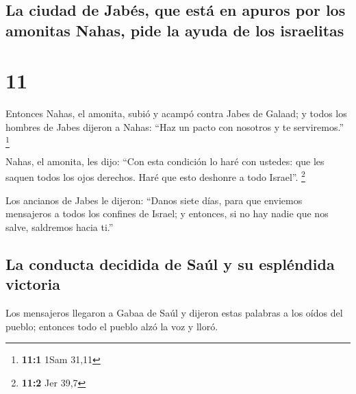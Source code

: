 \hypertarget{la-ciudad-de-jabuxe9s-que-estuxe1-en-apuros-por-los-amonitas-nahas-pide-la-ayuda-de-los-israelitas}{%
\subsection{La ciudad de Jabés, que está en apuros por los amonitas
Nahas, pide la ayuda de los
israelitas}\label{la-ciudad-de-jabuxe9s-que-estuxe1-en-apuros-por-los-amonitas-nahas-pide-la-ayuda-de-los-israelitas}}

\hypertarget{section-10}{%
\section{11}\label{section-10}}

 Entonces Nahas, el amonita, subió y acampó contra Jabes
de Galaad; y todos los hombres de Jabes dijeron a Nahas: ``Haz un pacto
con nosotros y te serviremos.'' \footnote{\textbf{11:1} 1Sam 31,11}

 Nahas, el amonita, les dijo: ``Con esta condición lo haré
con ustedes: que les saquen todos los ojos derechos. Haré que esto
deshonre a todo Israel''. \footnote{\textbf{11:2} Jer 39,7}

 Los ancianos de Jabes le dijeron: ``Danos siete días,
para que enviemos mensajeros a todos los confines de Israel; y entonces,
si no hay nadie que nos salve, saldremos hacia ti.''

\hypertarget{la-conducta-decidida-de-sauxfal-y-su-espluxe9ndida-victoria}{%
\subsection{La conducta decidida de Saúl y su espléndida
victoria}\label{la-conducta-decidida-de-sauxfal-y-su-espluxe9ndida-victoria}}

 Los mensajeros llegaron a Gabaa de Saúl y dijeron estas
palabras a los oídos del pueblo; entonces todo el pueblo alzó la voz y
lloró.


